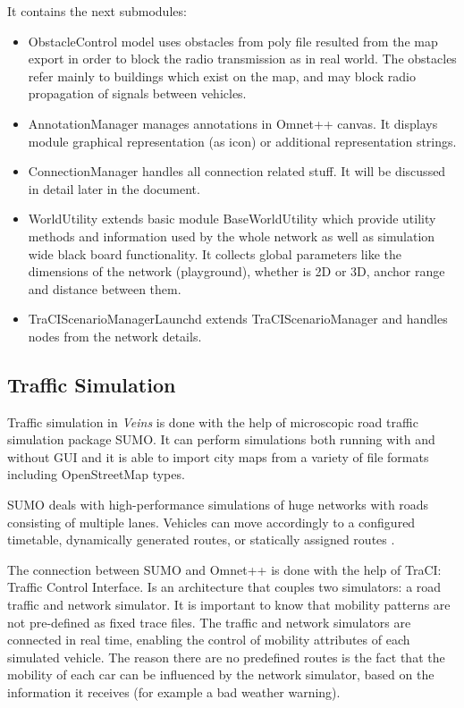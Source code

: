 It contains the next submodules:

\begin{itemize}
  \item ObstacleControl model uses obstacles from poly file resulted from the
  map export in order to block the radio transmission as in real world. The
  obstacles refer mainly to buildings which exist on the map, and may block
  radio propagation of signals between vehicles.
  \item AnnotationManager manages annotations in Omnet++ canvas. It displays
  module graphical representation (as icon) or additional representation
  strings.
  \item ConnectionManager handles all connection related stuff. It will be
  discussed in detail later in the document.
  \item WorldUtility extends basic module BaseWorldUtility which provide utility
  methods and information used by the whole network as well as simulation wide
  black board functionality. It collects global parameters like the dimensions
  of the network (playground), whether is 2D or 3D, anchor range and distance
  between them.
  \item TraCIScenarioManagerLaunchd extends TraCIScenarioManager and handles
  nodes from the network details.
\end{itemize}


\subsection{Traffic Simulation}

Traffic simulation in {\it Veins} is done with the help of microscopic road
traffic simulation package SUMO. It can perform simulations both running with
and without GUI and it is able to import city maps from a variety of file
formats including OpenStreetMap types.

SUMO deals with high-performance simulations of huge networks with roads
consisting of multiple lanes. Vehicles can move accordingly to a configured
timetable, dynamically generated routes, or statically assigned routes
\cite{bidirectionally_sumo}.

The connection between SUMO and Omnet++ is done with the help of TraCI: Traffic
Control Interface. Is an architecture that couples two simulators: a road
traffic and network simulator. It is important to know that mobility patterns
are not pre-defined as fixed trace files. The traffic and network simulators are
connected in real time, enabling the control of mobility attributes of each
simulated vehicle. The reason there are no predefined routes is the fact that
the mobility of each car can be influenced by the network simulator, based on
the information it receives (for example a bad weather warning).

